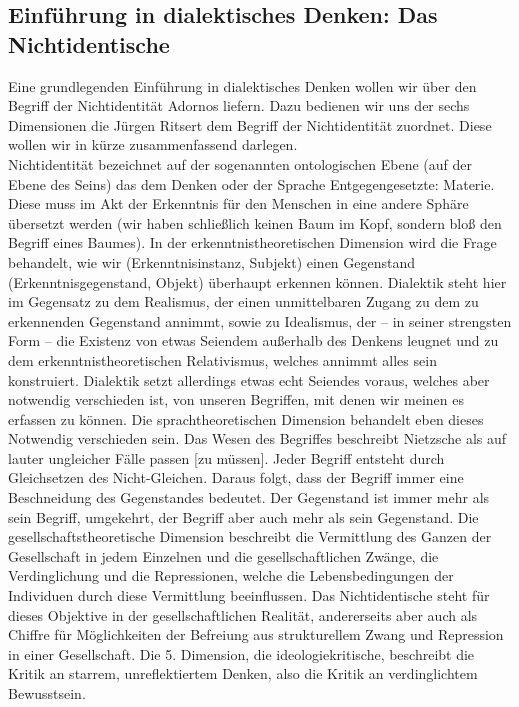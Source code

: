 \documentclass[a4paper, 12pt]{scrartcl}
\begin{document}
    \subsection{Einführung in dialektisches Denken: Das Nichtidentische}
    Eine grundlegenden Einführung in dialektisches Denken wollen wir über den Begriff der Nichtidentität Adornos liefern. 
    Dazu bedienen wir uns der sechs Dimensionen die Jürgen Ritsert dem Begriff der Nichtidentität zuordnet. 
    Diese wollen wir in kürze zusammenfassend darlegen. \\
    Nichtidentität bezeichnet auf der sogenannten ontologischen Ebene (auf der Ebene des Seins) das dem Denken oder der Sprache Entgegengesetzte: Materie. 
    Diese muss im Akt der Erkenntnis für den Menschen in eine andere Sphäre übersetzt werden (wir haben schließlich keinen Baum im Kopf, sondern bloß den Begriff eines Baumes). 
    In der erkenntnistheoretischen Dimension wird die Frage behandelt, wie wir (Erkenntnisinstanz, Subjekt) einen Gegenstand (Erkenntnisgegenstand, Objekt) überhaupt erkennen können. 
    Dialektik steht hier im Gegensatz zu dem Realismus, der einen unmittelbaren Zugang zu dem zu erkennenden Gegenstand annimmt, sowie zu Idealismus, der – in seiner strengsten Form – die Existenz von etwas Seiendem außerhalb des Denkens leugnet und zu dem erkenntnistheoretischen Relativismus, welches annimmt alles sein konstruiert. 
    Dialektik setzt allerdings etwas echt Seiendes voraus, welches aber notwendig verschieden ist, von unseren Begriffen, mit denen wir meinen es erfassen zu können. 
    Die sprachtheoretischen Dimension behandelt eben dieses Notwendig verschieden sein. 
    Das Wesen des Begriffes beschreibt Nietzsche als \glqq auf lauter ungleicher Fälle passen [zu müssen]. Jeder Begriff entsteht durch Gleichsetzen des Nicht-Gleichen\grqq. 
    Daraus folgt, dass der Begriff immer eine Beschneidung des Gegenstandes bedeutet. Der Gegenstand ist immer mehr als sein Begriff, umgekehrt, der Begriff aber auch mehr als sein Gegenstand. 
    Die gesellschaftstheoretische Dimension beschreibt die Vermittlung des Ganzen der Gesellschaft in jedem Einzelnen und die gesellschaftlichen Zwänge, die Verdinglichung und die Repressionen, welche die Lebensbedingungen der Individuen durch diese Vermittlung beeinflussen. 
    Das Nichtidentische steht für dieses Objektive in der gesellschaftlichen Realität, andererseits aber auch \glqq als Chiffre für Möglichkeiten der Befreiung aus strukturellem Zwang und Repression in einer Gesellschaft\grqq. 
    Die 5. Dimension, die ideologiekritische, beschreibt die Kritik an starrem, unreflektiertem Denken, also die Kritik an verdinglichtem Bewusstsein. 
\end{document}
